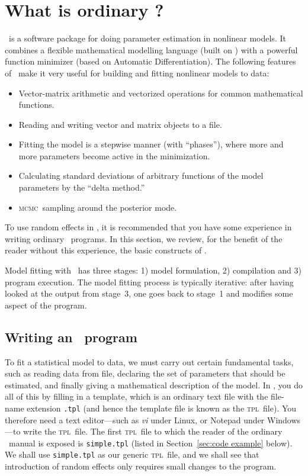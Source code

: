 \documentclass{admbmanual}
\newcommand{\scMCMC}{\textsc{mcmc}}
\begin{document}
\section{What is ordinary \scAB?}

\scAB\ is a software package for doing parameter estimation in nonlinear
models. It combines a flexible mathematical modelling language (built on
\cplus) with a powerful function minimizer (based on Automatic
Differentiation). The following features of \scAB\ make it very useful for
building and fitting nonlinear models to data:

\begin{itemize}
\item Vector-matrix arithmetic and vectorized operations for common mathematical functions.
\item Reading and writing vector and matrix objects to a file.
\item Fitting the model is a stepwise manner (with ``phases''), where more and more parameters become active in the minimization.
\item Calculating standard deviations of arbitrary functions of the model parameters by the ``delta method.''
\item \scMCMC\ sampling around the posterior mode.
\end{itemize}
To use random effects in \scAB, it is recommended that you have some experience in writing ordinary \scAB\ programs.
In this section, we review, for the benefit of the reader without this experience, the basic constructs of \scAB.

Model fitting with \scAB\ has three stages: 1) model formulation, 2) compilation and 3) program execution.
The model fitting process is typically iterative: after having looked at the output from stage~3, one goes back to
stage~1 and modifies some aspect of the program.


\subsection{Writing an \scAB\ program}

To fit a statistical model to data, we must carry out certain fundamental tasks, such as
reading data from file, declaring the set of parameters that should be estimated, and finally giving a
mathematical description of the model. In \scAB, you do all of this by filling in a template, which is an ordinary
text file with the file-name extension \texttt{.tpl} (and hence the template file is known as the \textsc{tpl}~file). You
therefore need a text editor---such as \textit{vi} under Linux, or Notepad under Windows---to write the \textsc{tpl}~file. The
first \textsc{tpl}~file to which the reader of the ordinary \scAB\ manual is exposed is \texttt{simple.tpl} (listed
in Section~\ref{sec:code example} below). We shall use \texttt{simple.tpl} as our generic \textsc{tpl}~file, and we shall
see that introduction of random effects only requires small changes to the program.
\end{document}
